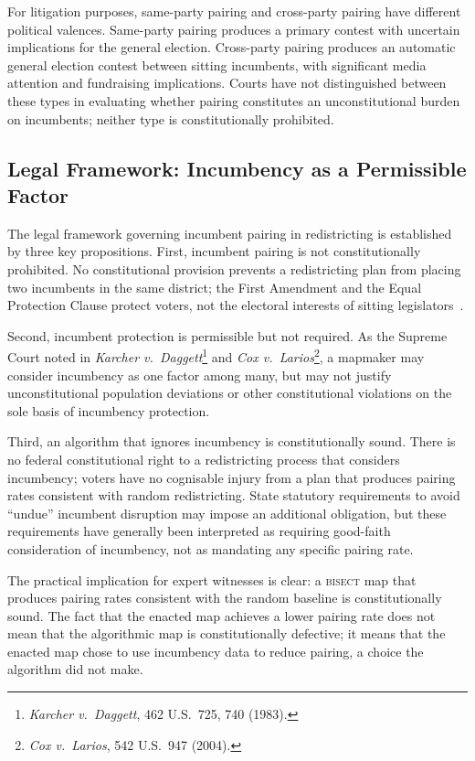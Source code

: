 For litigation purposes, same-party pairing and cross-party pairing have different
political valences. Same-party pairing produces a primary contest with uncertain
implications for the general election. Cross-party pairing produces an automatic general
election contest between sitting incumbents, with significant media attention and
fundraising implications. Courts have not distinguished between these types in
evaluating whether pairing constitutes an unconstitutional burden on incumbents; neither
type is constitutionally prohibited.

\subsection{Legal Framework: Incumbency as a Permissible Factor}

The legal framework governing incumbent pairing in redistricting is established by
three key propositions. First, incumbent pairing is not constitutionally prohibited.
No constitutional provision prevents a redistricting plan from placing two incumbents
in the same district; the First Amendment and the Equal Protection Clause protect
voters, not the electoral interests of sitting legislators~\citep{rucho2019}.

Second, incumbent protection is permissible but not required. As the Supreme Court
noted in \textit{Karcher v.\ Daggett}\footnote{\textit{Karcher v.\ Daggett}, 462
U.S.\ 725, 740 (1983).} and \textit{Cox v.\ Larios}\footnote{\textit{Cox v.\ Larios},
542 U.S.\ 947 (2004).}, a mapmaker may consider incumbency as one factor among
many, but may not justify unconstitutional population deviations or other constitutional
violations on the sole basis of incumbency protection.

Third, an algorithm that ignores incumbency is constitutionally sound. There is no
federal constitutional right to a redistricting process that considers incumbency;
voters have no cognisable injury from a plan that produces pairing rates consistent
with random redistricting. State statutory requirements to avoid ``undue'' incumbent
disruption may impose an additional obligation, but these requirements have generally
been interpreted as requiring good-faith consideration of incumbency, not as mandating
any specific pairing rate.

The practical implication for expert witnesses is clear: a \textsc{bisect} map that
produces pairing rates consistent with the random baseline is constitutionally sound.
The fact that the enacted map achieves a lower pairing rate does not mean that the
algorithmic map is constitutionally defective; it means that the enacted map chose
to use incumbency data to reduce pairing, a choice the algorithm did not make.

